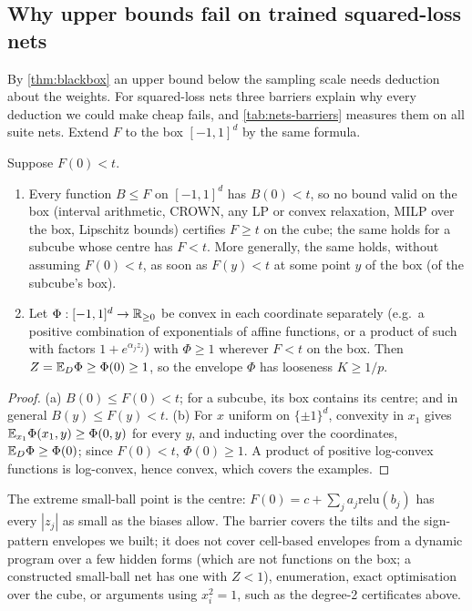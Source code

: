 \subsection{Why upper bounds fail on trained squared-loss nets}\label{sec:nets-barriers}

By \cref{thm:blackbox} an upper bound below the sampling scale needs deduction about
the weights. For squared-loss nets three barriers explain why every deduction we
could make cheap fails, and \cref{tab:nets-barriers} measures them on all
\nnBarNets{} suite nets. Extend $F$ to the box $[-1,1]^d$ by the same formula.

\begin{proposition}\label{prop:boxbarrier}
Suppose $F(0)<t$.
\begin{enumerate}[label=(\alph*)]
\item Every function $B\le F$ on $[-1,1]^d$ has $B(0)<t$, so no bound valid on the
box (interval arithmetic, CROWN, any LP or convex relaxation, MILP over the box,
Lipschitz bounds) certifies $F\ge t$ on the cube; the same holds for a subcube whose
centre has $F<t$. More generally, the same holds, without assuming $F(0)<t$, as soon as
$F(y)<t$ at some point $y$ of the box (of the subcube's box).
\item Let $\Phi:[-1,1]^d\to\mathbb{R}_{\ge0}$ be convex in each coordinate separately (e.g.\ a
positive combination of exponentials of affine functions, or a product of such with
factors $1+e^{\alpha_jz_j}$) with $\Phi\ge1$ wherever $F<t$ on the box. Then
$Z=\mathbb{E}_D\Phi\ge\Phi(0)\ge1$, so the envelope $\Phi$ has looseness $K\ge1/p$.
\end{enumerate}
\end{proposition}

\begin{proof}
(a) $B(0)\le F(0)<t$; for a subcube, its box contains its centre; and in general
$B(y)\le F(y)<t$. (b) For $x$ uniform
on $\{\pm1\}^d$, convexity in $x_1$ gives $\mathbb{E}_{x_1}\Phi(x_1,y)\ge\Phi(0,y)$ for every
$y$, and inducting over the coordinates, $\mathbb{E}_D\Phi\ge\Phi(0)$; since $F(0)<t$,
$\Phi(0)\ge1$. A product of positive log-convex functions is log-convex, hence convex,
which covers the examples.
\end{proof}

The extreme small-ball point is the centre: $F(0)=c+\sum_ja_j\mathrm{relu}(b_j)$ has
every $|z_j|$ as small as the biases allow. The barrier covers the tilts and the
sign-pattern envelopes we built; it does not cover cell-based envelopes from a dynamic
program over a few hidden forms (which are not functions on the box; a constructed
small-ball net has one with $Z<1$), enumeration, exact optimisation over the cube, or
arguments using $x_i^2=1$, such as the degree-2 certificates above.

